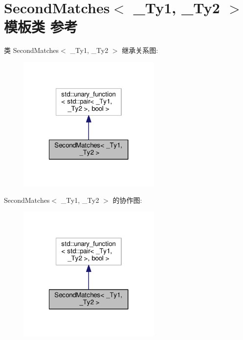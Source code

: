 \hypertarget{class_second_matches}{\section{Second\+Matches$<$ \+\_\+\+Ty1, \+\_\+\+Ty2 $>$ 模板类 参考}
\label{class_second_matches}
}


类 Second\+Matches$<$ \+\_\+\+Ty1, \+\_\+\+Ty2 $>$ 继承关系图\+:
\nopagebreak
\begin{figure}[H]
\begin{center}
\leavevmode
\includegraphics[width=200pt]{class_second_matches__inherit__graph}
\end{center}
\end{figure}


Second\+Matches$<$ \+\_\+\+Ty1, \+\_\+\+Ty2 $>$ 的协作图\+:
\nopagebreak
\begin{figure}[H]
\begin{center}
\leavevmode
\includegraphics[width=200pt]{class_second_matches__coll__graph}
\end{center}
\end{figure}
